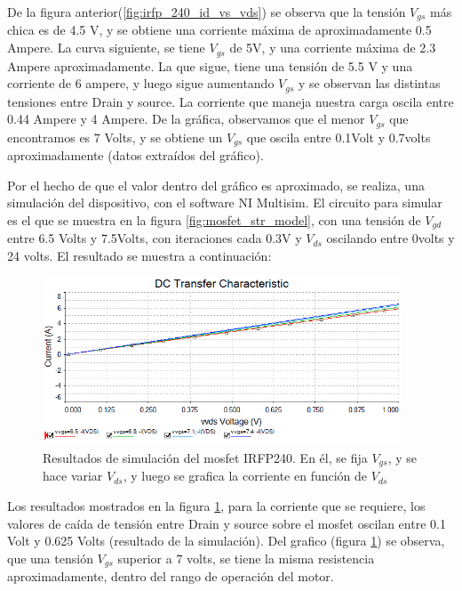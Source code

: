 De la figura anterior(\ref{fig:irfp_240_id_vs_vds}) se observa que la tensión $V_{gs}$ más chica es de 4.5 V, y se obtiene una corriente máxima de aproximadamente 0.5 Ampere. La curva siguiente, se tiene $V_{gs}$ de 5V, y una corriente máxima de 2.3 Ampere aproximadamente. La que sigue, tiene una tensión de 5.5 V y una corriente de 6 ampere, y luego sigue aumentando $V_{gs}$ y se observan las distintas tensiones entre Drain y source. La corriente que maneja nuestra carga oscila entre 0.44 Ampere y 4 Ampere. De la gráfica, observamos que el menor $V_{gs}$ que encontramos es 7 Volts, y se obtiene un $V_{gs}$ que oscila entre 0.1Volt y 0.7volts aproximadamente (datos extraídos del gráfico). 

Por el hecho de que el valor dentro del gráfico es aproximado, se realiza, una simulación del dispositivo, con el software NI Multisim. El circuito para simular es el que se muestra en la figura \ref{fig:mosfet_str_model}, con una tensión de $V_{gd}$ entre 6.5 Volts y 7.5Volts, con iteraciones cada 0.3V y $V_{ds}$ oscilando entre 0volts y 24 volts. El resultado se muestra a continuación:

\begin{figure}[ht!]
	\includegraphics[width=\linewidth,height=5cm]{simul_irfp240} 
	\caption{Resultados de simulación del mosfet IRFP240. En él, se fija $V_{gs}$, y se hace variar $V_{ds}$, y luego se grafica la corriente en función de $V_{ds}$}
	\label{fig:simul_irfp240}
\end{figure}

Los resultados mostrados en la figura \ref{fig:simul_irfp240}, para la corriente que se requiere, los valores de caída de tensión entre Drain y source sobre el mosfet oscilan entre 0.1 Volt y 0.625 Volts (resultado de la simulación). Del grafico (figura \ref{fig:simul_irfp240}) se observa, que una tensión $V_{gs}$ superior a 7 volts, se tiene la misma resistencia aproximadamente, dentro del rango de operación del motor. 










